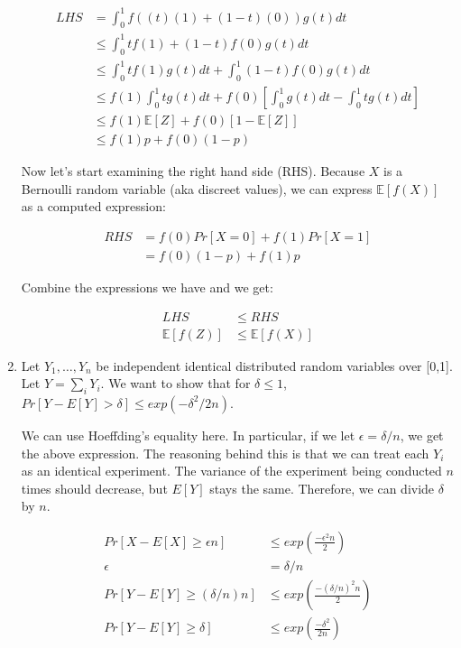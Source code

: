 \documentclass[11pt]{article}
\theoremstyle{definition}
\theoremstyle{case}
\theoremstyle{theorem}
\begin{document}
\begin{enumerate}[label=(\alph*)]
\begin{align*}
  LHS &= \int_0^1 f( (t)(1) + (1 - t)(0)) g(t) dt \\
      &\leq \int_0^1 t f(1) + (1 - t) f(0) g(t) dt  \\
      &\leq \int_0^1 t f(1) g(t) dt + \int_0^1 (1 - t) f(0) g(t) dt \\
      &\leq f(1) \int_0^1 t g(t) dt + f(0) [\int_0^1 g(t) dt - \int_0^1 t g(t) dt] \\
      &\leq f(1) \mathbb{E}[Z] + f(0) [1 - \mathbb{E}[Z]] \\
      &\leq f(1) p + f(0) (1 - p)
\end{align*}

Now let's start examining the right hand side (RHS). Because $X$ is a Bernoulli 
random variable (aka discreet values), we can express $\mathbb{E}[f(X)]$ as
a computed expression:

\begin{align*}
  RHS &= f(0) Pr[X = 0] + f(1) Pr[X = 1] \\
      &= f(0) (1 - p) + f(1) p
\end{align*}

Combine the expressions we have and we get:

\begin{align*}
  LHS &\leq RHS \\
  \mathbb{E}[f(Z)] &\leq \mathbb{E}[f(X)]
\end{align*}

\item Let $Y_1, \hdots, Y_n$ be independent identical distributed random variables over [0,1]. 
Let $Y = \sum_i Y_i$. We want to show that for $\delta \leq 1$, $Pr[Y - E[Y] > \delta] \leq exp(-\delta^2/2n)$.

We can use Hoeffding's equality here. In particular, if we let $\epsilon = \delta/n$, we get the above expression.
The reasoning behind this is that we can treat each $Y_i$ as an identical experiment. The variance of the experiment 
being conducted $n$ times should decrease, but $E[Y]$ stays the same. Therefore, we can divide $\delta$ by $n$.

\begin{align*}
Pr[X - E[X] \geq \epsilon n] &\leq exp(\frac{-\epsilon^2n}{2}) \\
\epsilon &= \delta/n \\
Pr[Y - E[Y] \geq (\delta/n) n ] &\leq exp(\frac{-(\delta/n)^2n}{2}) \\
Pr[Y - E[Y] \geq \delta ] &\leq exp(\frac{-\delta^2}{2n})
\end{align*}

\end{enumerate}
\end{document}

